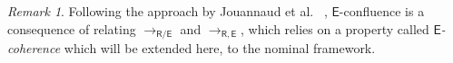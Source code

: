 \documentclass[submission,copyright,creativecommons]{eptcs}
\newcommand{\daniele}[1]{\textcolor{cyan}{#1}}
\newcommand{\alert}[1]{\textcolor{red}{#1}}
\newcommand{\dani}[1]{\textcolor{orange}{#1}}
\newcommand{\theory}[1]{\ensuremath{\mathsf{#1}}}
\theoremstyle{plain}
\theoremstyle{definition}
\newtheorem{definition}[theorem]{Definition}
\theoremstyle{remark}
\newtheorem{remark}[theorem]{Remark}
\begin{document}
\begin{remark}\label{rmk:e-coherence-prop}
Following the approach by Jouannaud et al. ~\cite{JouannaudKK83:Incremental}, $\theory{E}$-confluence is a consequence of relating $\to_{\theory{R/E}}$ and $\to_{\theory{R,E}}$, which relies on a property called {\em $\theory{E}$-coherence} which will be extended here, to the nominal framework.



 


\end{remark}
\end{document}
